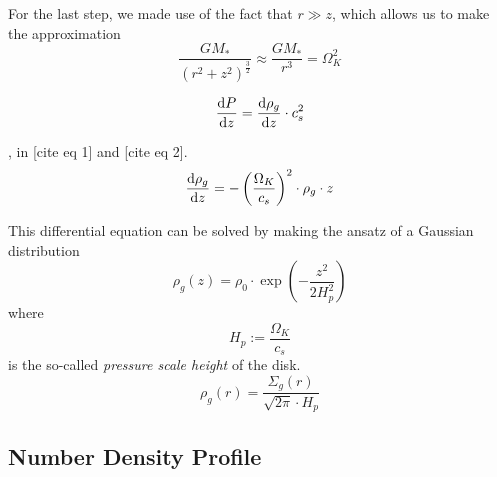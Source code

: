         For the last step, we made use of the fact that $r \gg z$, which allows us to make the 
        approximation
        \begin{equation}
            \frac{GM_*}{(r^2+z^2)^\frac{3}{2}}
                \approx \frac{GM_*}{r^3}
                = \Omega_K^2
        \end{equation}

        \begin{equation}
            \frac{\text{d} P}{\text{d} z}
                = \frac{\text{d} \rho_g}{\text{d} z}\cdot c_s^2
        \end{equation}

        , in [cite eq 1] and [cite eq 2]. \\
        \begin{equation}
            \frac{\text{d} \rho_g}{\text{d} z}
                = - \left(\frac{\Omega_K}{c_s}\right)^2 \cdot \rho_g \cdot z
        \end{equation}

        This differential equation can be solved by making the ansatz of a Gaussian distribution
        \begin{equation}
            \rho_g(z)
                = 
                    \rho_0\cdot\exp\left(-\frac{z^2}{2H_p^2}\right)
        \end{equation}
        where
        \begin{equation}
            H_p
                :=\frac{\Omega_K}{c_s}
        \end{equation}
        is the so-called \textit{pressure scale height} of the disk. \\

        \begin{equation}
            \rho_g(r)
                =\frac{\Sigma_g(r)}{\sqrt{2\pi}\cdot H_p}
        \end{equation}

    \subsection{Number Density Profile}


